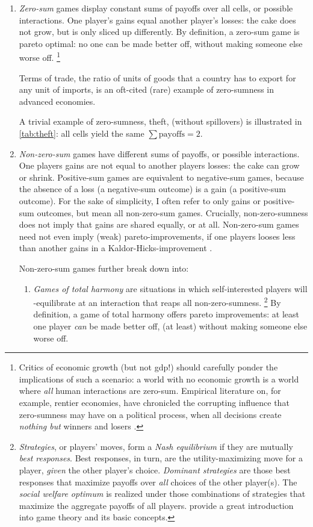 \begin{enumerate}
	\item
	\emph{Zero-sum} games display constant sums of payoffs over all cells, or possible interactions.
	One player's gains equal another player's losses:
	the cake does not grow, but is only sliced up differently.
	By definition, a zero-sum game is pareto optimal:
	no one can be made better off, without making someone else worse off.
	\footnote{
		Critics of economic growth (but not \gls{gdp}!) should carefully ponder the implications of such a scenario:
		a world with no economic growth is a world where \emph{all} human interactions are zero-sum.
		Empirical literature on, for example, rentier economies, have chronicled the corrupting influence that zero-sumness may have on a political process, when all decisions create \emph{nothing but} winners and losers \citep{Beblawi1990}.
	}

	Terms of trade, the ratio of units of goods that a country has to export for any unit of imports, is an oft-cited (rare) example of zero-sumness in advanced economies.%

	A trivial example of zero-sumness, theft, (without spillovers) is illustrated in \autoref{tab:theft}:
	all cells yield the same $\sum{\text{payoffs}}=2$.

	\item
	\emph{Non-zero-sum} games have different sums of payoffs, or possible interactions.
	One players gains are not equal to another players losses:
	the cake can grow or shrink.
	Positive-sum games are equivalent to negative-sum games, because the absence of a loss (a negative-sum outcome) is a gain (a positive-sum outcome).
	For the sake of simplicity, I often refer to only gains or positive-sum outcomes, but mean all non-zero-sum games.
	Crucially, non-zero-sumness does not imply that gains are shared equally, or at all.
	Non-zero-sum games need not even imply (weak) pareto-improvements, if one players looses less than another gains in a Kaldor-Hicks-improvement \citep{Kaldor1939,Hicks1939}.

	Non-zero-sum games further break down into:

	\begin{enumerate}
		\item
		\emph{Games of total harmony} are situations in which self-interested players will \citeauthor{Nash1951}-equilibrate at an interaction that reaps all non-zero-sumness.
		\footnote{
			\emph{Strategies}, or players' moves, form a \emph{Nash equilibrium} if they are mutually \emph{best responses}.
			Best responses, in turn, are the utility-maximizing move for a player, \emph{given} the other player's choice.
			\emph{Dominant strategies} are those best responses that maximize payoffs over \emph{all} choices of the other player(s).
			The \emph{social welfare optimum} is realized under those combinations of strategies that maximize the aggregate payoffs of all players.
			\cite{Kleinberg-2009-oz} provide a great introduction into game theory and its basic concepts.
		}
		By definition, a game of total harmony offers pareto improvements:
		at least one player \emph{can} be made better off, (at least) without making someone else worse off.


\end{enumerate}
\end{enumerate}
